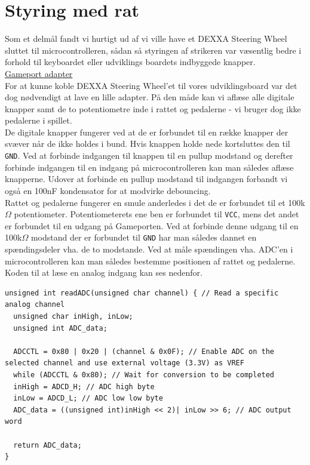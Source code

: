\section{Styring med rat}
Som et delmål fandt vi hurtigt ud af vi ville have et DEXXA Steering Wheel sluttet til microcontrolleren, sådan så styringen af strikeren var væsentlig bedre i forhold til keyboardet eller udviklings boardets indbyggede knapper.\\

\underline{Gameport adapter}\\

For at kunne koble DEXXA Steering Wheel'et til vores udviklingsboard var det dog nødvendigt at lave en lille adapter. På den måde kan vi aflæse alle digitale knapper samt de to potentiometre inde i rattet og pedalerne - vi bruger dog ikke pedalerne i spillet.\\

De digitale knapper fungerer ved at de er forbundet til en række knapper der svæver når de ikke holdes i bund. Hvis knappen holde nede kortsluttes den til \texttt{GND}. Ved at forbinde indgangen til knappen til en pullup modstand og derefter forbinde indgangen til en indgang på microcontrolleren kan man således aflæse knapperne. Udover at forbinde en pullup modstand til indgangen forbandt vi også en 100nF kondensator for at modvirke debouncing.\\

Rattet og pedalerne fungerer en smule anderledes i det de er forbundet til et 100k$\Omega$ potentiometer. Potentiometerets ene ben er forbundet til \texttt{VCC}, mens det andet er forbundet til en udgang på Gameporten. Ved at forbinde denne udgang til en 100k$\Omega$ modstand der er forbundet til \texttt{GND} har man således dannet en spændingsdeler vha. de to modstande. Ved at måle spændingen vha. ADC'en i microcontrolleren kan man således bestemme positionen af rattet og pedalerne.\\

Koden til at læse en analog indgang kan ses nedenfor.

\begin{lstlisting}[frame=single]
unsigned int readADC(unsigned char channel) { // Read a specific analog channel
  unsigned char inHigh, inLow;
  unsigned int ADC_data;
  
  ADCCTL = 0x80 | 0x20 | (channel & 0x0F); // Enable ADC on the selected channel and use external voltage (3.3V) as VREF
  while (ADCCTL & 0x80); // Wait for conversion to be completed
  inHigh = ADCD_H; // ADC high byte
  inLow = ADCD_L; // ADC low low byte
  ADC_data = ((unsigned int)inHigh << 2)| inLow >> 6; // ADC output word
  
  return ADC_data;
}
\end{lstlisting}

